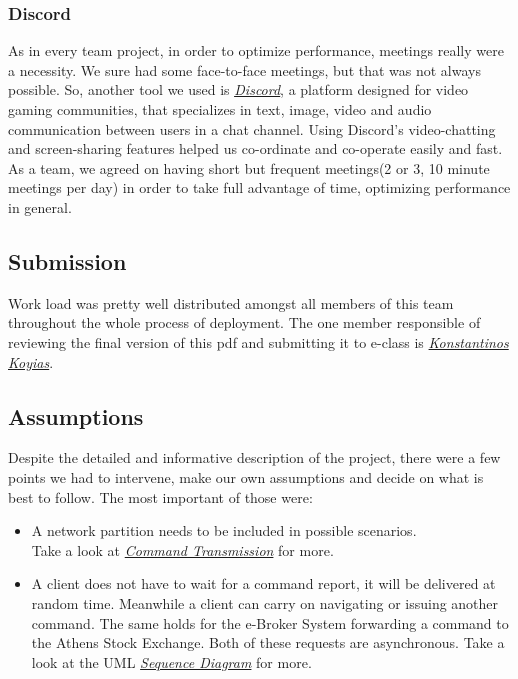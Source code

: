 \documentclass{article}
\begin{document}
\subsubsection{Discord}
As in every team project, in order to optimize performance, meetings really were a necessity. We sure had some face-to-face meetings, but that was not always possible. So, another tool we used is \href{https://discordapp.com/}{\underline{\emph{Discord}}}, a platform designed for video gaming communities, that specializes in text, image, video and audio communication between users in a chat channel. Using Discord's video-chatting and screen-sharing features helped us co-ordinate and co-operate easily and fast. As a team, we agreed on having short but frequent meetings(2 or 3, 10 minute meetings per day) in order to take full advantage of time, optimizing performance in general.

\subsection{Submission}
Work load was pretty well distributed amongst all members of this team throughout the whole process of deployment. The one member responsible of reviewing the final version of this pdf and submitting it to e-class is{\hypersetup{
    urlcolor=black,    
}
\href{https://github.com/KostasKoyias}{\emph{Konstantinos Koyias}}}.  

\newpage
\subsection{Assumptions}
Despite the detailed and informative description of the project, there were a few points we had to intervene, make our own assumptions and decide on what is best to follow. The most important of those were:
\begin{itemize}
\item A network partition needs to be included in possible scenarios.\\
Take a look at {\hypersetup{
    linkcolor=blue,    
}\hyperlink{CmdTrns}{\textit{Command Transmission}}} for more. 
\item A client does not have to wait for a command report, it will be delivered at random time. Meanwhile a client can
carry on navigating or issuing another command. The same holds for the e-Broker System forwarding a command to the
Athens Stock Exchange. Both of these requests are asynchronous. Take a look at the UML {\hypersetup{
    linkcolor=blue,    
}\hyperlink{Asynchronous}{\textit{Sequence Diagram}}} for more.
\end{itemize} 
\end{document}
